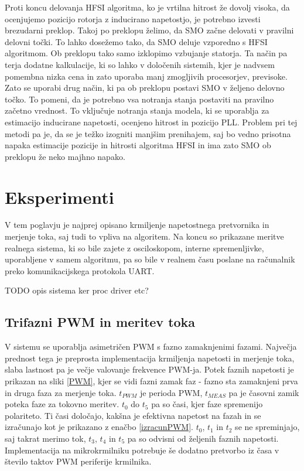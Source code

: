 \documentclass[a4paper,twoside,openright,12pt,slovene]{book}
\begin{document}
Proti koncu delovanja HFSI algoritma, ko je vrtilna hitrost že dovolj visoka, da ocenjujemo pozicijo rotorja z inducirano napetostjo, je potrebno izvesti brezudarni preklop. Takoj po preklopu želimo,
da SMO začne delovati v pravilni delovni točki. To lahko dosežemo tako, da SMO deluje vzporedno s HFSI algoritmom. Ob preklopu tako samo izklopimo vzbujanje statorja. Ta način pa terja dodatne
kalkulacije, ki so lahko v določenih sistemih, kjer je nadvsem pomembna nizka cena in zato uporaba manj zmogljivih procesorjev, previsoke. Zato se uporabi drug način, ki pa ob preklopu postavi SMO v
željeno delovno točko. To pomeni, da je potrebno vsa notranja stanja postaviti na pravilno začetno vrednost. To vključuje notranja stanja modela, ki se uporablja za estimacijo inducirane napetosti,
ocenjeno hitrost in pozicijo PLL. Problem pri tej metodi pa je, da se je težko izogniti manjšim prenihajem, saj bo vedno prisotna napaka estimacije pozicije in hitrosti algoritma HFSI in ima zato SMO ob
preklopu že neko majhno napako. 


\chapter{Eksperimenti}  \label{eksperimenti}

V tem poglavju je najprej opisano krmiljenje napetostnega pretvornika in merjenje toka, saj tudi to vpliva na algoritem. Na koncu so prikazane meritve realnega sistema, ki so bile zajete z
osciloskopom, interne spremenljivke, uporabljene v samem algoritmu, pa so bile v realnem času poslane na računalnik preko komunikacijskega protokola UART. 

TODO opis sistema ker proc driver etc?

\section{Trifazni PWM in meritev toka}

V sistemu se uporablja asimetričen PWM s fazno zamaknjenimi fazami. Največja prednost tega je preprosta implementacija krmiljenja napetosti in merjenje toka, slaba lastnost pa je večje valovanje
frekvence PWM-ja. Potek faznih napetosti je prikazan na sliki \ref{PWM}, kjer se vidi fazni zamak faz - fazno sta zamaknjeni prva in druga faza za merjenje toka. $t_{PWM}$ je perioda PWM, $t_{MEAS}$
pa je časovni zamik poteka faze za tokovno meritev. $t_0$ do $t_5$ pa so časi, kjer faze spremenijo polariteto. Ti časi določajo, kakšna je efektivna napetost na fazah in se izračunajo kot je
prikazano z enačbo \ref{izracunPWM}. $t_0$, $t_1$ in $t_2$ se ne spreminjajo, saj takrat merimo tok, $t_3$, $t_4$ in $t_5$ pa so odvisni od željenih faznih napetosti. Implementacija na mikrokrmilniku
potrebuje še dodatno pretvorbo iz časa v število taktov PWM periferije krmilnika.
\end{document}
